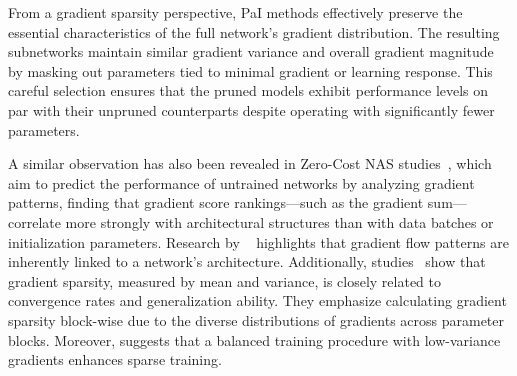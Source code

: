 From a gradient sparsity perspective, PaI methods effectively preserve the essential characteristics of the full network’s gradient distribution. The resulting subnetworks maintain similar gradient variance and overall gradient magnitude by masking out parameters tied to minimal gradient or learning response. This careful selection ensures that the pruned models exhibit performance levels on par with their unpruned counterparts despite operating with significantly fewer parameters.


A similar observation has also been revealed in Zero-Cost NAS studies~\cite{abdelfattahzero, lizico, xiang2023exploiting}, which aim to predict the performance of untrained networks by analyzing gradient patterns, finding that gradient score rankings—such as the gradient sum—correlate more strongly with architectural structures than with data batches or initialization parameters. Research by ~\cite{bhardwaj2021doestopologyinfluencegradient} highlights that gradient flow patterns are inherently linked to a network's architecture. Additionally, studies~\cite{lizico, xiang2023exploiting} show that gradient sparsity, measured by mean and variance, is closely related to convergence rates and generalization ability. They emphasize calculating gradient sparsity block-wise due to the diverse distributions of gradients across parameter blocks. Moreover, \cite{lei2023balanceessenceacceleratingsparse} suggests that a balanced training procedure with low-variance gradients enhances sparse training.






